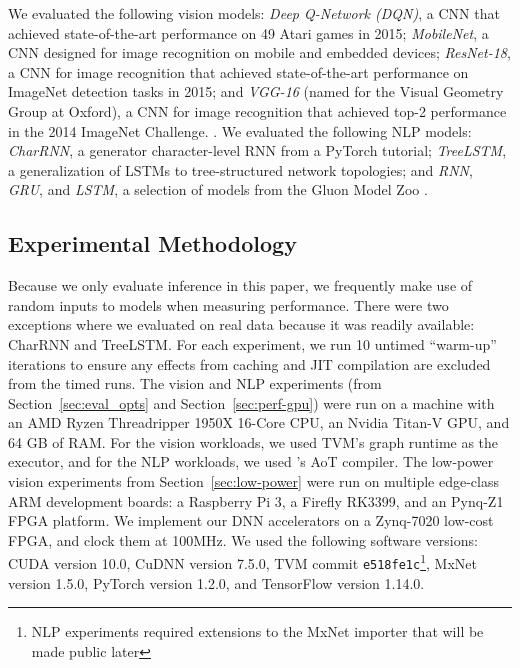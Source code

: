 We evaluated the following vision models:
  \textit{Deep Q-Network (DQN)}, a CNN that achieved state-of-the-art performance
  on 49 Atari games in 2015;
  \textit{MobileNet}, a CNN designed for image recognition on mobile and
  embedded devices;
  \textit{ResNet-18}, a CNN for image recognition that achieved state-of-the-art
  performance on ImageNet detection tasks in 2015;
  and \textit{VGG-16} (named for the Visual Geometry Group at Oxford),
    a CNN for image recognition that achieved top-2 performance in the 2014 ImageNet Challenge.
  \cite{dqn, mobilenet, resnet, vgg}.
We evaluated the following NLP models:
  \textit{CharRNN}, a generator character-level
  RNN from a PyTorch tutorial;
  \textit{TreeLSTM}, a generalization of LSTMs to
  tree-structured network topologies;
  and \textit{RNN}, \textit{GRU}, and \textit{LSTM}, a selection of models from the Gluon
  Model Zoo
  \cite{pytorch_rnn_tut, tree_lstm, gluon_model_zoo}.

\subsection{Experimental Methodology}
Because we only evaluate inference in this paper,
  we frequently make use of random inputs to models when measuring
  performance.
There were two exceptions where we evaluated on real data because
  it was readily available: CharRNN and TreeLSTM.
For each experiment,
  we run 10 untimed ``warm-up'' iterations to ensure any effects from caching and
  JIT compilation are excluded from the timed runs.
The vision and NLP experiments (from Section~\ref{sec:eval_opts} and Section~\ref{sec:perf-gpu})
  were run on a machine with an AMD Ryzen Threadripper 1950X 16-Core CPU,
  an Nvidia Titan-V GPU,
  and 64 GB of RAM.
For the vision workloads,
  we used TVM's graph runtime as the executor,
  and for the NLP workloads,
  we used \relay's AoT compiler.
The low-power vision experiments from Section~\ref{sec:low-power} were run on multiple edge-class ARM development boards: a Raspberry Pi 3, a Firefly RK3399, and an Pynq-Z1 FPGA platform.
We implement our DNN accelerators on a Zynq-7020 low-cost FPGA, and clock them at 100MHz.
We used the following software versions:
  CUDA version 10.0,
  CuDNN version 7.5.0,
  TVM commit \texttt{e518fe1c}\footnote{NLP experiments required extensions to the MxNet importer that will be made public later},
  MxNet version 1.5.0,
  PyTorch version 1.2.0,
  and TensorFlow version 1.14.0.

